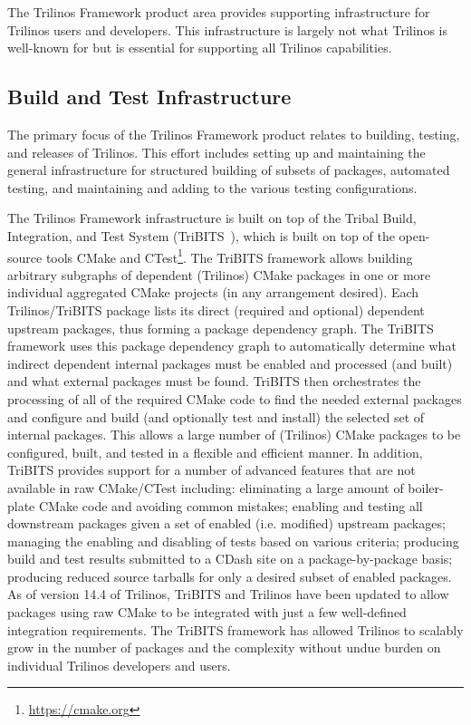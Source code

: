 
The Trilinos Framework product area provides supporting infrastructure for Trilinos users and developers. This infrastructure is largely not what Trilinos is well-known for but is essential for supporting all Trilinos capabilities.

\subsection{Build and Test Infrastructure}

The primary focus of the Trilinos Framework product relates to building, testing, and releases of Trilinos. This effort includes setting up and maintaining the general infrastructure for structured building of subsets of packages, automated testing, and maintaining and adding to the various testing configurations.

The Trilinos Framework infrastructure is built on top of the Tribal Build, Integration, and Test System (TriBITS~\cite{Bartlett2014}), which is built on top of the open-source tools CMake and CTest\footnote{\url{https://cmake.org}}.
The TriBITS framework allows building arbitrary subgraphs of dependent (Trilinos) CMake packages in one or more individual aggregated CMake projects (in any arrangement desired).
Each Trilinos/TriBITS package lists its direct (required and optional) dependent upstream packages, thus forming a package dependency graph.
The TriBITS framework uses this package dependency graph to automatically determine what indirect dependent internal packages must be enabled and processed (and built) and what external packages must be found.
TriBITS then orchestrates the processing of all of the required CMake code to find the needed external packages and configure and build (and optionally test and install) the selected set of internal packages.
This allows a large number of (Trilinos) CMake packages to be configured, built, and tested in a flexible and efficient manner.
In addition, TriBITS provides support for a number of advanced features that are not available in raw CMake/CTest including: eliminating a large amount of boiler-plate CMake code and avoiding common mistakes; enabling and testing all downstream packages given a set of enabled (i.e. modified) upstream packages; managing the enabling and disabling of tests based on various criteria; producing build and test results submitted to a CDash site on a package-by-package basis; producing reduced source tarballs for only a desired subset of enabled packages.
As of version 14.4 of Trilinos, TriBITS and Trilinos have been updated to allow packages using raw CMake to be integrated with just a few well-defined integration requirements. The TriBITS framework has allowed Trilinos to scalably grow in the number of packages and the complexity without undue burden on individual Trilinos developers and users.

